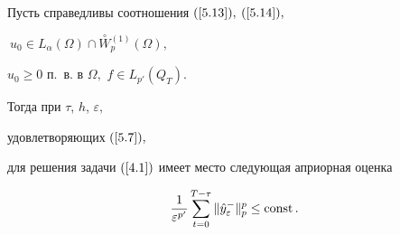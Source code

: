 

%


\begin{lemm}\label{l5.2}


Пусть справедливы соотношения $(\ref{5.13}),$ $(\ref{5.14}),$


$\ u_0 \in L_\alpha (\Omega) \cap


 \overset \circ W{}^{(1)}_p (\Omega),$


$u_0 \ge 0$ п.~в. в $ \Omega,$ $f \in L_{p'}(Q_T) $.


Тогда при  $\tau$, $h$, $\varepsilon,$


удовлетворяющих $(\ref{5.7}),$


для решения задачи $(\ref{4.1})$ имеет место следующая априорная оценка


\begin{equation}


\frac{1}{\varepsilon^{p'}} \sum^{T-\tau}_{t=0}


\| \Hat{y}_\varepsilon ^{-}\|^p_p \le \const.


\label{5.03}


\end{equation}


\end{lemm}


